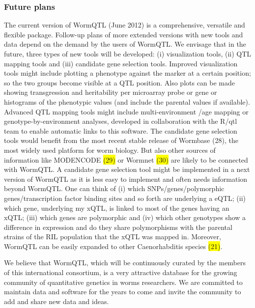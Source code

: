 \subsubsection{Future plans}
The current version of WormQTL (June 2012) is a comprehensive, versatile and flexible package. 
Follow-up plans of more extended versions with new tools and data depend on the demand by the 
users of WormQTL. We envisage that in the future, three types of new tools will be developed: 
(i) visualization tools, (ii) QTL mapping tools and (iii) candidate gene selection tools. Improved 
visualization tools might include plotting a phenotype against the marker at a certain position; 
so the two groups become visible at a QTL position. Also plots can be made showing transgression 
and heritability per microarray probe or gene or histograms of the phenotypic values (and include 
the parental values if available). Advanced QTL mapping tools might include multi-environment
/age mapping or genotype-by-environment analyses, developed in collaboration with the R/qtl team 
to enable automatic links to this software. The candidate gene selection tools would benefit from 
the most recent stable release of Wormbase (28), the most widely used platform for worm biology. 
But also other sources of information like MODENCODE \colorbox{yellow}{(29)} or Wormnet 
\colorbox{yellow}{(30)} are likely to 
be connected with WormQTL. A candidate gene selection tool might be implemented in a next version 
of WormQTL as it is less easy to implement and often needs information beyond WormQTL. One can 
think of (i) which SNPs/genes/polymorphic genes/transcription factor binding sites and so forth 
are underlying a eQTL; (ii) which gene, underlying my xQTL, is linked to most of the genes 
having an xQTL; (iii) which genes are polymorphic and (iv) which other genotypes show a difference 
in expression and do they share polymorphisms with the parental strains of the RIL population 
that the xQTL was mapped in. Moreover, WormQTL can be easily expanded to other Caenorhabditis 
species \colorbox{yellow}{(21)}.

We believe that WormQTL, which will be continuously curated by the members of this international 
consortium, is a very attractive database for the growing community of quantitative genetics in 
worms researchers. We are committed to maintain data and software for the years to come and invite 
the community to add and share new data and ideas.

